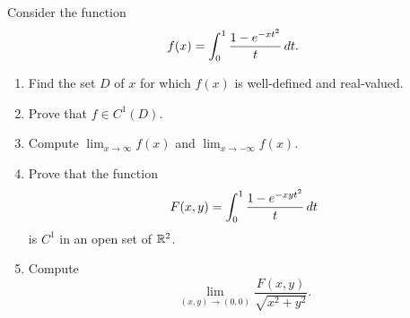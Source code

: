 \documentclass[a4paper]{article}
\author{\nauthor\\
Carnegie Mellon University}
\begin{document}
\begin{ex}
  Consider the function
  \[
    f(x) = \int_0^1 \frac{1 - e^{-x t^2}}{t} \, d t.
  \]

  \begin{enumerate}
    \item Find the set $D$ of $x$ for which $f(x)$ is well-defined and
          real-valued.

    \item Prove that $f \in C^1(D)$.
    \item Compute $\lim_{x \to \infty} f(x)$ and $\lim_{x \to -\infty}
          f(x)$.
    \item Prove that the function
          \[
            F(x, y) = \int_0^1 \frac{1 - e^{-x y t^2}}{t} \, d t
          \]
          is $C^1$ in an open set of $\mathbb{R}^2$.
    \item Compute
          \[
            \lim_{(x, y) \to (0, 0)} \frac{F(x, y)}{\sqrt{x^2 + y^2}}.
          \]
  \end{enumerate}
\end{ex}
\end{document}
